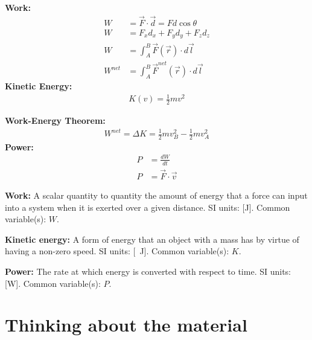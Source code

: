 \begin{importantEquations}
\begin{multicols}{2}
\textbf{Work:}
\begin{align*}
W &= \vec F \cdot \vec d = Fd\cos\theta\\
W &= F_xd_x+F_yd_y+F_zd_z\\
W &=\int_A^B \vec F(\vec r) \cdot  d\vec l\\
W^{net} &= \int_A^B \vec F^{net}(\vec r) \cdot d\vec l
\end{align*}
\textbf{Kinetic Energy:}
\begin{align*}
K(v) = \frac{1}{2} mv^2
\end{align*}
\columnbreak

\textbf{Work-Energy Theorem:}
\begin{align*}
W^{net} = \Delta K = \frac{1}{2} mv_B^2 - \frac{1}{2} mv_A^2
\end{align*}
\textbf{Power:}
\begin{align*}
P &= \frac{dW}{dt}\\
P &= \vec F \cdot \vec v
\end{align*}
\end{multicols}
\end{importantEquations}

\begin{definitions}
	\textbf{Work:} A scalar quantity to quantity the amount of energy that a force can input into a system when it is exerted over a given distance. SI units: [\si{J}]. Common variable(s): $W$.
	\item \textbf{Kinetic energy:} A form of energy that an object with a mass has by virtue of having a non-zero speed. SI units: [\SI{}{J}]. Common variable(s): $K$.
	\item \textbf{Power:} The rate at which energy is converted with respect to time. SI units: [\si{W}]. Common variable(s): $P$.
\end{definitions}

\newpage
\section{Thinking about the material}


